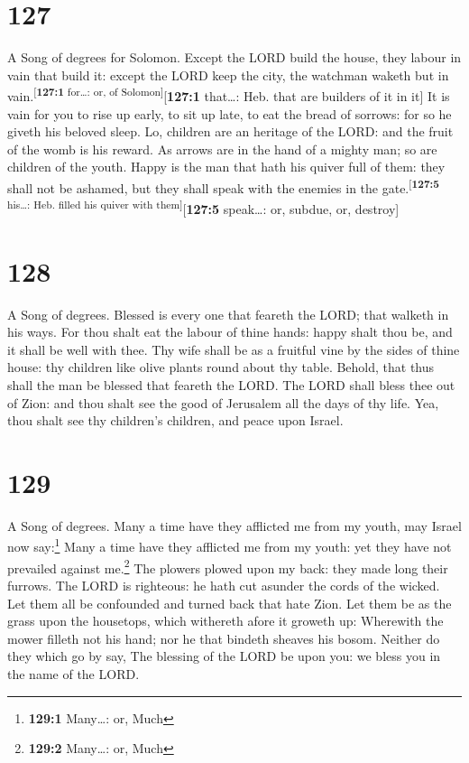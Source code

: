 \hypertarget{section-128}{%
\section{127}\label{section-128}}

A Song of degrees for Solomon.  Except the LORD build the
house, they labour in vain that build it: except the LORD keep the city,
the watchman waketh but in vain.\textsuperscript{{[}\textbf{127:1}
for\ldots: or, of Solomon{]}}{[}\textbf{127:1} that\ldots: Heb. that are
builders of it in it{]}  It is vain for you to rise up
early, to sit up late, to eat the bread of sorrows: for so he giveth his
beloved sleep.  Lo, children are an heritage of the LORD:
and the fruit of the womb is his reward.  As arrows are in
the hand of a mighty man; so are children of the youth. 
Happy is the man that hath his quiver full of them: they shall not be
ashamed, but they shall speak with the enemies in the
gate.\textsuperscript{{[}\textbf{127:5} his\ldots: Heb. filled his
quiver with them{]}}{[}\textbf{127:5} speak\ldots: or, subdue, or,
destroy{]}

\hypertarget{section-129}{%
\section{128}\label{section-129}}

A Song of degrees.  Blessed is every one that feareth the
LORD; that walketh in his ways.  For thou shalt eat the
labour of thine hands: happy shalt thou be, and it shall be well with
thee.  Thy wife shall be as a fruitful vine by the sides
of thine house: thy children like olive plants round about thy table.
 Behold, that thus shall the man be blessed that feareth
the LORD.  The LORD shall bless thee out of Zion: and thou
shalt see the good of Jerusalem all the days of thy life. 
Yea, thou shalt see thy children's children, and peace upon Israel.

\hypertarget{section-130}{%
\section{129}\label{section-130}}

A Song of degrees.  Many a time have they afflicted me
from my youth, may Israel now say:\footnote{\textbf{129:1} Many\ldots:
  or, Much}  Many a time have they afflicted me from my
youth: yet they have not prevailed against me.\footnote{\textbf{129:2}
  Many\ldots: or, Much}  The plowers plowed upon my back:
they made long their furrows.  The LORD is righteous: he
hath cut asunder the cords of the wicked.  Let them all be
confounded and turned back that hate Zion.  Let them be as
the grass upon the housetops, which withereth afore it groweth up:
 Wherewith the mower filleth not his hand; nor he that
bindeth sheaves his bosom.  Neither do they which go by
say, The blessing of the LORD be upon you: we bless you in the name of
the LORD.

